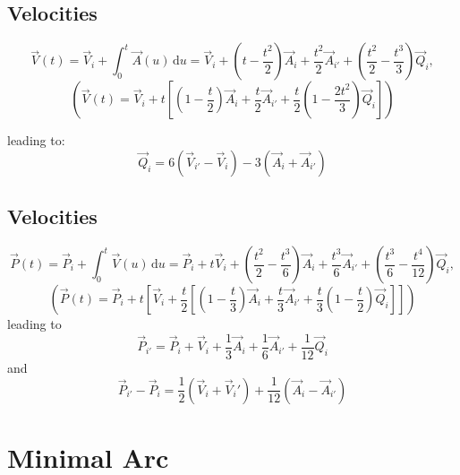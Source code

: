 \documentclass[aps,12pt]{revtex4}
\begin{document}
\subsection{Velocities}
\begin{equation}
	\vec{V}(t) = \vec{V}_i + \int_0^t \vec{A}(u)\,\mathrm{d}u =
	 \vec{V}_i 
	 + \left(t-\frac{t^2}{2}\right) \vec{A}_i 
	 + \frac{t^2}{2} \vec{A}_{i'}
	 + \left(\frac{t^2}{2}-\frac{t^3}{3}\right) \vec{Q}_i,
\end{equation}
\begin{equation}
	\left(\vec{V}(t) = 
	 \vec{V}_i 
	 + t \left[ \left(1-\frac{t}{2}\right) \vec{A}_i 
	 + \frac{t}{2} \vec{A}_{i'}
	 + \frac{t}{2}\left(1-\frac{2t^2}{3}\right) \vec{Q}_i \right]
	 \right)
\end{equation}

leading to:
\begin{equation}
\boxed{
	\vec{Q}_i = 6 \left( \vec{V}_{i'} - \vec{V}_i \right) - 3 \left( \vec{A}_i + \vec{A}_{i'} \right)
}
\end{equation}

\subsection{Velocities}
\begin{equation}
	\vec{P}(t) = \vec{P}_i + \int_0^t \vec{V}(u) \, \mathrm{d}u = 
	\vec{P}_i 
	+ t \vec{V}_i
	+ \left( \frac{t^2}{2} - \frac{t^3}{6}\right) \vec{A}_i
	+ \frac{t^3}{6} \vec{A}_{i'}
	+ \left(\frac{t^3}{6} -\frac{t^4}{12} \right) \vec{Q}_i,
\end{equation}
\begin{equation}
	\left( \vec{P}(t) = \vec{P}_i 	
	+ t \left[\vec{V}_i
	+ \frac{t}{2}\left[ \left( 1 - \frac{t}{3}\right) \vec{A}_i
	+ \frac{t}{3} \vec{A}_{i'}
	+ \frac{t}{3}\left(1 -\frac{t}{2} \right) \vec{Q}_i
	\right]
	\right]
	 \right)
\end{equation}
leading to
\begin{equation}
	\vec{P}_{i'} =  \vec{P}_{i} + \vec{V}_i + \frac{1}{3} \vec{A}_i + \frac{1}{6} \vec{A}_{i'} + \frac{1}{12} \vec{Q}_i
\end{equation}
and
\begin{equation}
\label{eq:A}
\boxed{
	\vec{P}_{i'} - \vec{P}_i = \frac{1}{2}\left( \vec{V}_i + \vec{V}_i' \right) + \frac{1}{12} \left( \vec{A}_i - \vec{A}_{i'} \right)
	}
\end{equation}

\section{Minimal Arc}
\end{document}
